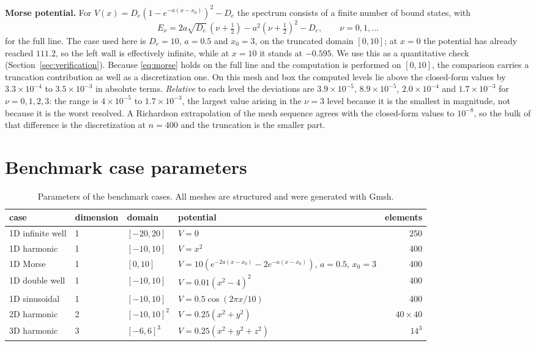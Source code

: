 \documentclass[pdflatex,sn-mathphys-num]{sn-jnl}
\theoremstyle{thmstyleone}%
\theoremstyle{thmstyletwo}%
\theoremstyle{thmstylethree}%
\begin{document}
\begin{appendices}
\textbf{Morse potential.} For
$V(x) = D_e(1 - e^{-a(x-x_0)})^2 - D_e$ the spectrum consists of a finite number
of bound states, with
%
\begin{equation}\label{eq:morse}
  E_\nu = 2a\sqrt{D_e}\,(\nu + \tfrac12) - a^2(\nu + \tfrac12)^2 - D_e ,
  \qquad \nu = 0, 1, \dots
\end{equation}
%
for the full line. The case used here is $D_e = 10$, $a = 0.5$ and $x_0 = 3$,
on the truncated domain $[0,10]$; at $x = 0$ the potential has already reached
$111.2$, so the left wall is effectively infinite, while at $x = 10$ it stands at
$-0.595$. We use this as a quantitative check
(Section~\ref{sec:verification}). Because \eqref{eq:morse} holds on the full
line and the computation is performed on $[0,10]$, the comparison carries a
truncation contribution as well as a discretization one. On this mesh and box
the computed levels lie above the closed-form values by
$3.3\times10^{-4}$ to $3.5\times10^{-3}$ in absolute terms. \emph{Relative} to
each level the deviations are $3.9\times10^{-5}$, $8.9\times10^{-5}$,
$2.0\times10^{-4}$ and $1.7\times10^{-3}$ for $\nu = 0,1,2,3$: the range is
$4\times10^{-5}$ to $1.7\times10^{-3}$, the largest value arising in the
$\nu = 3$ level because it is the smallest in magnitude, not because it is the
worst resolved. A Richardson extrapolation of the mesh sequence agrees with the
closed-form values to $10^{-8}$, so the bulk of that difference is the
discretization at $n=400$ and the truncation is the smaller part.

\section{Benchmark case parameters}\label{app:cases}

\begin{table}[h]
\caption{Parameters of the benchmark cases. All meshes are structured and were
generated with \textsf{Gmsh}.}\label{tab:params}
\begin{tabular}{@{}llllr@{}}
\toprule
case & dimension & domain & potential & elements \\
\midrule
1D infinite well & 1 & $[-20, 20]$ & $V = 0$ & 250 \\
1D harmonic      & 1 & $[-10, 10]$ & $V = x^2$ & 400 \\
1D Morse         & 1 & $[0, 10]$   & $V = 10(e^{-2a(x-x_0)} - 2e^{-a(x-x_0)})$, $a = 0.5$, $x_0 = 3$ & 400 \\
1D double well   & 1 & $[-10, 10]$ & $V = 0.01(x^2 - 4)^2$ & 400 \\
1D sinusoidal    & 1 & $[-10, 10]$ & $V = 0.5\cos(2\pi x/10)$ & 400 \\
2D harmonic      & 2 & $[-10,10]^2$ & $V = 0.25(x^2 + y^2)$ & $40\times40$ \\
3D harmonic      & 3 & $[-6,6]^3$  & $V = 0.25(x^2 + y^2 + z^2)$ & $14^3$ \\
\bottomrule
\end{tabular}
\end{table}


\end{appendices}
\end{document}
